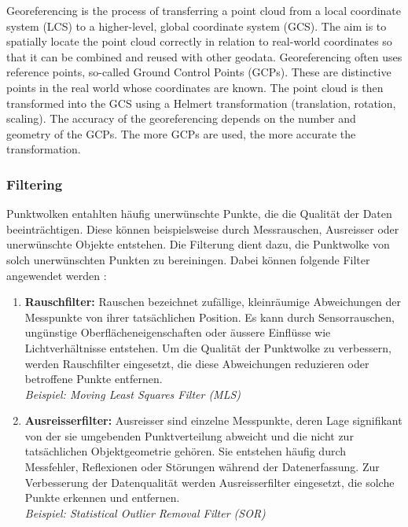 \begin{English}
    Georeferencing is the process of transferring a point cloud from a local coordinate system (LCS) to a higher-level, global coordinate system (GCS). The aim is to spatially locate the point cloud correctly in relation to real-world coordinates so that it can be combined and reused with other geodata. Georeferencing often uses reference points, so-called Ground Control Points (GCPs). These are distinctive points in the real world whose coordinates are known. The point cloud is then transformed into the GCS using a Helmert transformation (translation, rotation, scaling). The accuracy of the georeferencing depends on the number and geometry of the GCPs. The more GCPs are used, the more accurate the transformation. \cite{voordendagKursGeodaetischeMesstechnik}
\end{English}

\subsubsection{Filtering}
\begin{German}
    Punktwolken entahlten häufig unerwünschte Punkte, die die Qualität der Daten beeinträchtigen. Diese können beispielsweise durch Messrauschen, Ausreisser oder unerwünschte Objekte entstehen. Die Filterung dient dazu, die Punktwolke von solch unerwünschten Punkten zu bereiningen. Dabei können folgende Filter angewendet werden \cite{liu3DPointCloud2021}:

    \begin{enumerate}
        \item \textbf{Rauschfilter:} Rauschen bezeichnet zufällige, kleinräumige Abweichungen der Messpunkte von ihrer tatsächlichen Position. Es kann durch Sensorrauschen, ungünstige Oberflächeneigenschaften oder äussere Einflüsse wie Lichtverhältnisse entstehen. Um die Qualität der Punktwolke zu verbessern, werden Rauschfilter eingesetzt, die diese Abweichungen reduzieren oder betroffene Punkte entfernen.\\
        \textit{Beispiel: Moving Least Squares Filter (MLS)}
        
        \item \textbf{Ausreisserfilter:} Ausreisser sind einzelne Messpunkte, deren Lage signifikant von der sie umgebenden Punktverteilung abweicht und die nicht zur tatsächlichen Objektgeometrie gehören. Sie entstehen häufig durch Messfehler, Reflexionen oder Störungen während der Datenerfassung. Zur Verbesserung der Datenqualität werden Ausreisserfilter eingesetzt, die solche Punkte erkennen und entfernen.\\
        \textit{Beispiel: Statistical Outlier Removal Filter (SOR)}
    \end{enumerate}
\end{German}

